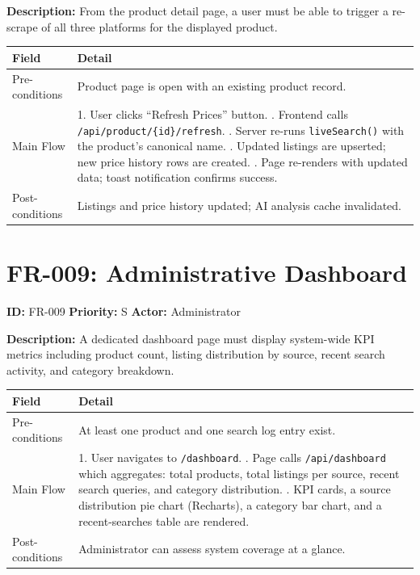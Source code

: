 \documentclass[12pt,a4paper]{report}
\begin{document}
\textbf{Description:} From the product detail page, a user must be able to
trigger a re-scrape of all three platforms for the displayed product.

\begin{longtable}{L{3cm} L{10cm}}
  \toprule
  \textbf{Field} & \textbf{Detail} \\
  \midrule
  \endhead
  Pre-conditions & Product page is open with an existing product record. \\[3pt]
  Main Flow &
    1. User clicks ``Refresh Prices'' button. . Frontend calls \texttt{/api/product/\{id\}/refresh}. . Server re-runs \texttt{liveSearch()} with the product's canonical name. . Updated listings are upserted; new price history rows are created. . Page re-renders with updated data; toast notification confirms success. \\[3pt]
  Post-conditions & Listings and price history updated; AI analysis cache invalidated. \\
  \bottomrule
\end{longtable}

\section{FR-009: Administrative Dashboard}

\begin{reqbox}
\textbf{ID:} FR-009 \quad \textbf{Priority:} S \quad \textbf{Actor:} Administrator
\end{reqbox}

\textbf{Description:} A dedicated dashboard page must display system-wide KPI
metrics including product count, listing distribution by source, recent search
activity, and category breakdown.

\begin{longtable}{L{3cm} L{10cm}}
  \toprule
  \textbf{Field} & \textbf{Detail} \\
  \midrule
  \endhead
  Pre-conditions & At least one product and one search log entry exist. \\[3pt]
  Main Flow &
    1. User navigates to \texttt{/dashboard}. . Page calls \texttt{/api/dashboard} which aggregates: total products,
       total listings per source, recent search queries, and category
       distribution. . KPI cards, a source distribution pie chart (Recharts), a category
       bar chart, and a recent-searches table are rendered. \\[3pt]
  Post-conditions & Administrator can assess system coverage at a glance. \\
  \bottomrule
\end{longtable}
\end{document}
